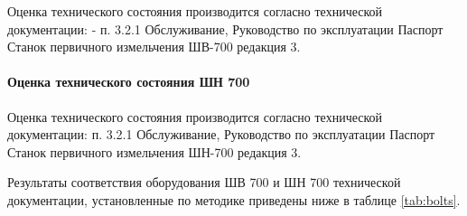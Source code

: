 Оценка технического состояния производится согласно  технической документации:
- п. 3.2.1 Обслуживание, Руководство по эксплуатации Паспорт Станок первичного измельчения ШВ-700 редакция 3.

\paragraph{Оценка технического состояния ШН 700}
Оценка технического состояния производится согласно  технической документации:
п. 3.2.1 Обслуживание, Руководство по эксплуатации Паспорт Станок первичного измельчения ШН-700 редакция 3.

Результаты соответствия оборудования ШВ 700 и ШН 700  технической документации, установленные по методике \cite{ecogold:2021}  приведены ниже в таблице \ref{tab:bolts}. 

%
%
%
%
%
%
%

